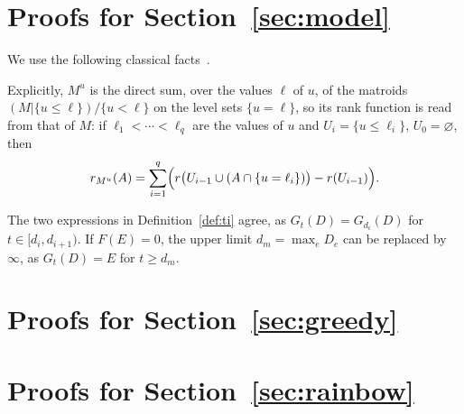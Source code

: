 
\section{Proofs for Section~\texorpdfstring{\ref{sec:model}}{2}}
\label{app:model}

We use the following classical facts~\cite{oxley11,schrijver03}.


Explicitly, $M^{u}$ is the direct sum, over the values $\ell$ of $u$, of the
matroids $(M|\{u\le\ell\})/\{u<\ell\}$ on the level sets $\{u=\ell\}$, so its
rank function is read from that of $M$: if $\ell_1<\cdots<\ell_q$ are the values
of $u$ and $U_i=\{u\le\ell_i\}$, $U_0=\varnothing$, then
\begin{equation}
  r_{M^{u}}(A)=\sum_{i=1}^{q}\Bigl(r\bigl(U_{i-1}\cup(A\cap\{u=\ell_i\})\bigr)-r(U_{i-1})\Bigr).
  \label{eq:rank-mu}
\end{equation}

The two expressions in Definition~\ref{def:ti} agree, as $G_t(D)=G_{d_i}(D)$ for
$t\in[d_i,d_{i+1})$.  If $F(E)=0$, the upper limit $d_m=\max_eD_e$ can be replaced
by $\infty$, as $G_t(D)=E$ for $t\ge d_m$.





\section{Proofs for Section~\texorpdfstring{\ref{sec:greedy}}{3}}
\label{app:greedy}







\section{Proofs for Section~\texorpdfstring{\ref{sec:rainbow}}{4}}
\label{app:rainbow}

